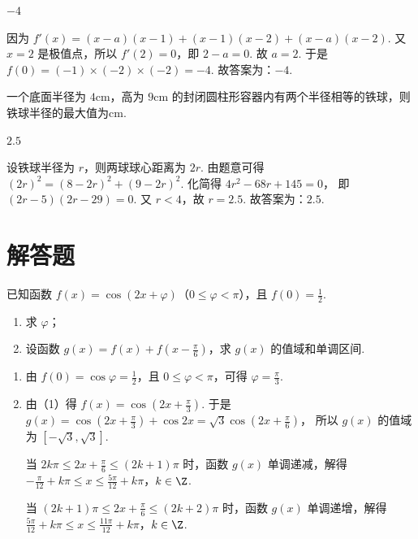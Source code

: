 \documentclass[UTF8,a4paper,oneside,11pt]{ctexbook}
\begin{document}
\begin{answer}
\(-4\)
\end{answer}

\begin{solution}
因为
\(f'(x)=(x-a)(x-1)+(x-1)(x-2)+(x-a)(x-2)\).
又 \(x=2\) 是极值点，所以 \(f'(2)=0\)，即
\(2-a=0\).
故 \(a=2\). 于是
\(f(0)=(-1)\times(-2)\times(-2)=-4\).
故答案为：\(-4\).
\end{solution}

\begin{problem}
一个底面半径为 \(4\text{cm}\)，高为 \(9\text{cm}\) 的封闭圆柱形容器内有两个半径相等的铁球，则铁球半径的最大值为\fillinblank{}\(\text{cm}\).
\end{problem}

\begin{answer}
\(2.5\)
\end{answer}

\begin{solution}
设铁球半径为 \(r\)，则两球球心距离为 \(2r\). 由题意可得
\((2r)^2=(8-2r)^2+(9-2r)^2\).
化简得
\(4r^2-68r+145=0\)，
即
\((2r-5)(2r-29)=0\).
又 \(r<4\)，故 \(r=2.5\). 故答案为：\(2.5\).
\end{solution}
\section{解答题}

\begin{problem}
已知函数 \(f(x)=\cos(2x+\varphi)\)（\(0\le \varphi<\pi\)），且 \(f(0)=\frac12\).
\begin{enumerate}
\item 求 \(\varphi\)；
\item 设函数 \(g(x)=f(x)+f\left(x-\frac{\pi}{6}\right)\)，求 \(g(x)\) 的值域和单调区间.
\end{enumerate}
\end{problem}

\begin{solution}
\begin{enumerate}
\item 由 \(f(0)=\cos\varphi=\frac12\)，且 \(0\le \varphi<\pi\)，可得
\(\varphi=\frac{\pi}{3}\).

\item 由（1）得
\(f(x)=\cos\left(2x+\frac{\pi}{3}\right)\).
于是
\(
g(x)=\cos\left(2x+\frac{\pi}{3}\right)+\cos 2x
=\sqrt3\cos\left(2x+\frac{\pi}{6}\right)
\)，
所以 \(g(x)\) 的值域为
\([-\sqrt3,\sqrt3]\).

当
\(2k\pi\le 2x+\frac{\pi}{6}\le (2k+1)\pi\)
时，函数 \(g(x)\) 单调递减，解得
\(-\frac{\pi}{12}+k\pi\le x\le \frac{5\pi}{12}+k\pi\)，\(k\in\Z\).

当
\((2k+1)\pi\le 2x+\frac{\pi}{6}\le (2k+2)\pi\)
时，函数 \(g(x)\) 单调递增，解得
\(\frac{5\pi}{12}+k\pi\le x\le \frac{11\pi}{12}+k\pi\)，\(k\in\Z\).
\end{enumerate}
\end{solution}
\end{document}
